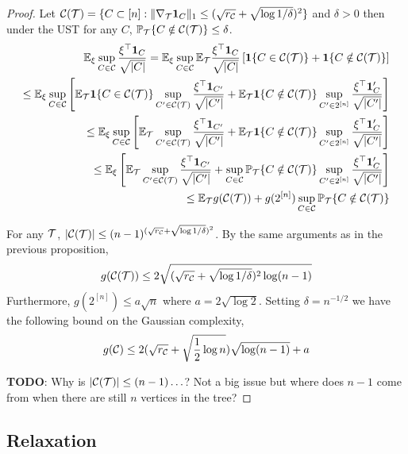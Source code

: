 \begin{proof}

Let $\mathcal{C}({\mathcal{T}}) = \{C \subset [n] : \|\nabla_{\mathcal{T}} {\bf 1}_C \|_1 \le (\sqrt{r_{\mathcal{C}}} + \sqrt{\log 1/\delta})^2 \}$ and $\delta > 0$ then under the UST for any $C$, $\mathbb{P}_{\mathcal{T}} \{C \notin \mathcal{C}({\mathcal{T}})\} \le \delta$.
\[
\begin{aligned}
\mathbb{E}_\xi \sup_{C \in \mathcal{C}} \frac{\xi^\top {\bf 1}_C}{\sqrt{|C|}} = \mathbb{E}_\xi \sup_{C \in \mathcal{C}} \mathbb{E}_{\mathcal{T}}  \frac{\xi^\top {\bf 1}_C}{\sqrt{|C|}} \left[ {\bf 1}\{ C \in \mathcal{C}({\mathcal{T}}) \} + {\bf 1}\{ C \notin \mathcal{C}({\mathcal{T}}) \} \right] \\
\le \mathbb{E}_\xi \sup_{C \in \mathcal{C}} \left[ \mathbb{E}_{\mathcal{T}} {\bf 1}\{ C \in \mathcal{C}({\mathcal{T}}) \} \sup_{C' \in \mathcal{C}({\mathcal{T}})}  \frac{\xi^\top {\bf 1}_{C'}}{\sqrt{|C'|}}
+ \mathbb{E}_{\mathcal{T}} {\bf 1}\{ C \notin \mathcal{C}({\mathcal{T}}) \} \sup_{C' \in 2^{[n]}} \frac{\xi^\top {\bf 1}_C'}{\sqrt{|C'|}} \right]\\
\le \mathbb{E}_\xi \sup_{C \in \mathcal{C}} \left[ \mathbb{E}_{\mathcal{T}} \sup_{C' \in \mathcal{C}({\mathcal{T}})}  \frac{\xi^\top {\bf 1}_{C'}}{\sqrt{|C'|}}
+ \mathbb{E}_{\mathcal{T}} {\bf 1}\{ C \notin \mathcal{C}({\mathcal{T}}) \} \sup_{C' \in 2^{[n]}} \frac{\xi^\top {\bf 1}_C'}{\sqrt{|C'|}} \right]\\
\le \mathbb{E}_\xi  \left[ \mathbb{E}_{\mathcal{T}} \sup_{C' \in \mathcal{C}({\mathcal{T}})}  \frac{\xi^\top {\bf 1}_{C'}}{\sqrt{|C'|}}
+ \sup_{C \in \mathcal{C}} \mathbb{P}_{\mathcal{T}} \{ C \notin \mathcal{C}({\mathcal{T}}) \} \sup_{C' \in 2^{[n]}} \frac{\xi^\top {\bf 1}_C'}{\sqrt{|C'|}} \right]\\
\le \mathbb{E}_{\mathcal{T}} g(\mathcal{C}({\mathcal{T}})) + g(2^{[n]}) \sup_{C \in \mathcal{C}} \mathbb{P}_{\mathcal{T}} \{ C \notin \mathcal{C}({\mathcal{T}}) \} 
\end{aligned}
\]

For any ${\mathcal{T}}$, $|\mathcal{C}({\mathcal{T}})| \le (n - 1)^{(\sqrt{r_{\mathcal{C}}} + \sqrt{\log 1/\delta})^2}$.
By the same arguments as in the previous proposition, 
\[
g(\mathcal{C}({\mathcal{T}})) \le 2 \sqrt{(\sqrt{r_{\mathcal{C}}} + \sqrt{\log 1/\delta})^2 \log (n-1)}
\]
Furthermore, $g(2^{[n]}) \le a \sqrt{n}$ where $a = 2 \sqrt{\log 2}$.
Setting $\delta = n^{-1/2}$ we have the following bound on the Gaussian complexity,
\[
g(\mathcal{C}) \le 2 (\sqrt{r_{\mathcal{C}}} + \sqrt{\frac{1}{2} \log n})\sqrt{\log (n-1)} + a
\]

\textbf{TODO}: Why is $|\mathcal{C}({\mathcal{T}})| \le (n-1) \ldots$? Not a big issue but where does $n-1$ come from when there are still $n$ vertices in the tree?

\end{proof}

\subsection{Relaxation}

